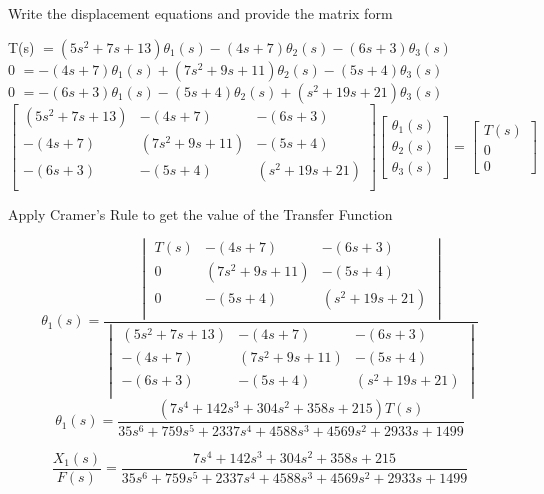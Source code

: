 \begin{fold}
\vspace{15pt}
\item Write the displacement equations and provide the matrix form
\begin{center}
T(s) $= (5s^2 + 7s + 13)\theta_1(s) - (4s + 7)\theta_2(s) - (6s + 3)\theta_3(s)$\\
0 $= -(4s + 7)\theta_1(s) +(7s^2 + 9s + 11)\theta_2(s) - (5s + 4)\theta_3(s)$\\
0 $= -(6s + 3)\theta_1(s) - (5s + 4)\theta_2(s) + (s^2 + 19s + 21)\theta_3(s)$\\
\[
\begin{bmatrix}
(5s^2 + 7s + 13) & -(4s + 7) & -(6s + 3)\\
-(4s + 7) & (7s^2 + 9s + 11) & -(5s + 4)\\
-(6s + 3) & -(5s + 4) & (s^2 + 19s + 21)\\
\end{bmatrix}
\begin{bmatrix}
\theta_1(s) \\
\theta_2(s) \\
\theta_3(s)
\end{bmatrix}
=
\begin{bmatrix}
T(s)\\
0\\
0
\end{bmatrix}
\]
\end{center}

		\item Apply Cramer's Rule to get the value of the Transfer Function
\begin{center}
	\[
		\theta_1(s) = 
			\frac{\begin{vmatrix}
				T(s) & -(4s + 7) & -(6s + 3)\\
				0 & (7s^2 + 9s + 11)  & -(5s + 4)\\
				0 & -(5s + 4) & (s^2 + 19s + 21)\\
			\end{vmatrix}
		}{\begin{vmatrix}
				(5s^2 + 7s + 13) & -(4s + 7) & -(6s + 3)\\
				-(4s + 7) & (7s^2 + 9s + 11) & -(5s + 4)\\
				-(6s + 3) & -(5s + 4) & (s^2 + 19s + 21)\\
			\end{vmatrix}
		}
	\]
	\[
	\theta_1(s) = \frac{(7s^4 + 142s^3 + 304s^2 + 358s + 215)T(s)}{35s^6 + 759s^5 + 2337s^4 + 4588s^3 + 4569s^2 + 2933s + 1499}
	\] 

	\[
	\boxed{\frac{X_1(s)}{F(s)} = \frac{7s^4 + 142s^3 + 304s^2 + 358s + 215}{35s^6 + 759s^5 + 2337s^4 + 4588s^3 + 4569s^2 + 2933s + 1499}}
	\] 

\end{center}


\end{fold}